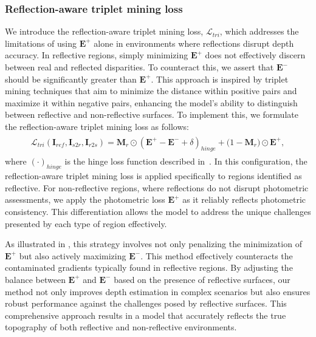 \subsubsection{Reflection-aware triplet mining loss}
\label{sec:mining}
We introduce the reflection-aware triplet mining loss, $\mathcal{L}_{tri}$, which addresses the limitations of using $\mathbf{E}^{+}$ alone in environments where reflections disrupt depth accuracy.
In reflective regions, simply minimizing $\mathbf{E}^{+}$ does not effectively discern between real and reflected disparities.
To counteract this, we assert that $\mathbf{E}^{-}$ should be significantly greater than $\mathbf{E}^{+}$. This approach is inspired by triplet mining techniques that aim to minimize the distance within positive pairs and maximize it within negative pairs, enhancing the model's ability to distinguish between reflective and non-reflective surfaces.
To implement this, we formulate the reflection-aware triplet mining loss as follows:
\begin{align}
\begin{split}
    \label{eq:cond_triplet}
    \mathcal{L}_{tri}(\mathbf{I}_{ref}, \mathbf{I}_{s2r}, \mathbf{I}_{r2s}) = \mathbf{M}_r \odot (\mathbf{E}^{+} - \mathbf{E}^{-} + \delta)_{hinge} + \big(1 - \mathbf{M}_r\big) \odot \mathbf{E}^{+},
\end{split}
\end{align}
where $(\cdot)_{hinge}$ is the hinge loss function described in~\citet{hearst1998support}.
In this configuration, the reflection-aware triplet mining loss is applied specifically to regions identified as reflective. For non-reflective regions, where reflections do not disrupt photometric assessments, we apply the photometric loss $\mathbf{E}^{+}$ as it reliably reflects photometric consistency.
This differentiation allows the model to address the unique challenges presented by each type of region effectively.

As illustrated in , this strategy involves not only penalizing the minimization of $\mathbf{E}^+$ but also actively maximizing $\mathbf{E}^-$. This method effectively counteracts the contaminated gradients typically found in reflective regions.
By adjusting the balance between $\mathbf{E}^+$ and $\mathbf{E}^-$ based on the presence of reflective surfaces, our method not only improves depth estimation in complex scenarios but also ensures robust performance against the challenges posed by reflective surfaces. This comprehensive approach results in a model that accurately reflects the true topography of both reflective and non-reflective environments. 

